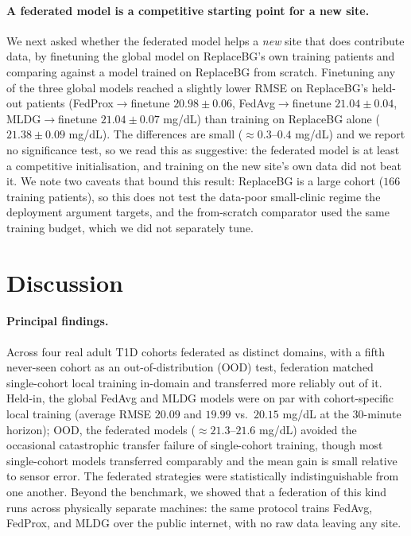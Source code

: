 \documentclass[10pt,letterpaper]{article}
\begin{document}
\paragraph{A federated model is a competitive starting point for a new site.} We
next asked whether the federated model helps a \emph{new} site that does
contribute data, by finetuning the global model on ReplaceBG's own training
patients and comparing against a model trained on ReplaceBG from scratch.
Finetuning any of the three global models reached a slightly lower RMSE on
ReplaceBG's held-out patients (FedProx$\rightarrow$finetune $20.98 \pm 0.06$,
FedAvg$\rightarrow$finetune $21.04 \pm 0.04$, MLDG$\rightarrow$finetune
$21.04 \pm 0.07$ mg/dL) than training on ReplaceBG alone
($21.38 \pm 0.09$ mg/dL). The differences are small ($\approx 0.3$--$0.4$ mg/dL)
and we report no significance test, so we read this as suggestive: the federated
model is at least a competitive initialisation, and training on the new site's
own data did not beat it. We note two caveats that bound this result: ReplaceBG
is a large cohort ($166$ training patients), so this does not test the
data-poor small-clinic regime the deployment argument targets, and the
from-scratch comparator used the same training budget, which we did not
separately tune.

\section*{Discussion}

\paragraph{Principal findings.} Across four real adult T1D cohorts federated as
distinct domains, with a fifth never-seen cohort as an out-of-distribution (OOD)
test, federation matched single-cohort local training in-domain and transferred
more reliably out of it. Held-in, the global FedAvg and MLDG models were on par
with cohort-specific local training (average RMSE $20.09$ and $19.99$ vs.\
$20.15$ mg/dL at the 30-minute horizon); OOD, the federated models
($\approx 21.3$--$21.6$ mg/dL) avoided the occasional catastrophic transfer
failure of single-cohort training, though most single-cohort models transferred
comparably and the mean gain is small relative to sensor error. The federated
strategies were statistically indistinguishable from one another. Beyond the
benchmark, we showed that a federation of this kind runs across physically
separate machines: the same protocol trains FedAvg, FedProx, and MLDG over the
public internet, with no raw data leaving any site.
\end{document}
